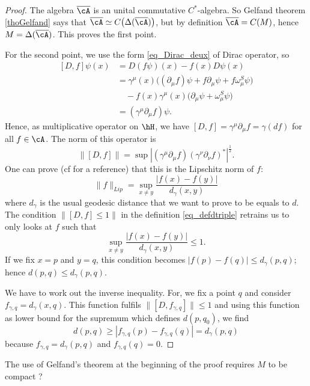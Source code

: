 \begin{proof}
The algebra $\overline{ \cA }$ is an unital commutative $C^*$-algebra. So Gelfand theorem \ref{thoGelfand} says that $\overline{ \cA }\simeq C\big( \Delta(\overline{ \cA }) \big)$, but by definition $\overline{\cA}=C(M)$, hence $M=\Delta(\overline{ \cA })$. This proves the first point.

For the second point, we use the form \eqref{eq_Dirac_deux} of Dirac operator, so
 \begin{equation}
\begin{split}
[D,f]\psi(x)&=D(f\psi)(x)-f(x)D\psi(x)\\
	&=\gamma^{\mu}(x)\big( (\partial_{\mu}f)\psi+f\partial_{\mu}\psi+f\omega_{\mu}^S\psi \big)\\
	&\quad -f(x)\gamma^{\mu}(x)\big( \partial_{\mu}\psi+\omega_{\mu}^S\psi \big)\\
	&=(\gamma^{\mu}\partial_{\mu}f)\psi.
\end{split}
\end{equation}
Hence, as multiplicative operator on $\hH$, we have $[D,f]=\gamma^{\mu}\partial_{\mu}f=\gamma(df)$ for all $f\in\cA$. The norm of this operator is
\[ 
  \| [D,f] \|=\sup | (\gamma^{\mu}\partial_{\mu}f)(\gamma^{\nu}\partial_{\nu}f)^* |^{\frac{ 1 }{2}}.
\]
One can prove (cf \cite{Landi} for a reference) that this is the Lipschitz norm of $f$:
\[ 
  \| f \|_{Lip}=\sup_{x\neq y}\frac{ | f(x)-f(y) | }{ d_{\gamma}(x,y) }
\]
where $d_{\gamma}$ is the usual geodesic distance that we want to prove to be equals to $d$. The condition $\| [D,f]\leq 1 \|$ in the definition  \eqref{eq_defdtriple} retrains us to only looks at $f$ such that 
\[ 
  \sup_{x\neq y}\frac{ | f(x)-f(y) | }{ d_{\gamma}(x,y) }\leq 1.
\]
If we fix $x=p$ and $y=q$, this condition becomes $| f(p)-f(q) |\leq d_{\gamma}(p,q)$; hence $d(p,q)\leq d_{\gamma}(p,q)$. 

We have to work out the inverse inequality. For, we fix a point $q$ and consider $f_{\gamma,q}=d_{\gamma}(x,q)$. This function fulfils $\| [D,f_{\gamma,q}] \| \leq 1$ and using this function as lower bound for the supremum which defines $d(p,q_0)$, we find
\[ 
  d(p,q)\geq | f_{\gamma,q}(p)-f_{\gamma,q}(q) |=d_{\gamma}(p,q)
\]
because $f_{\gamma,q}=d_{\gamma}(p,q)$ and $f_{\gamma,q}(q)=0$.

\end{proof}

\begin{probleme}
	The use of Gelfand's theorem at the beginning of the proof requires $M$ to be compact ?
\end{probleme}

